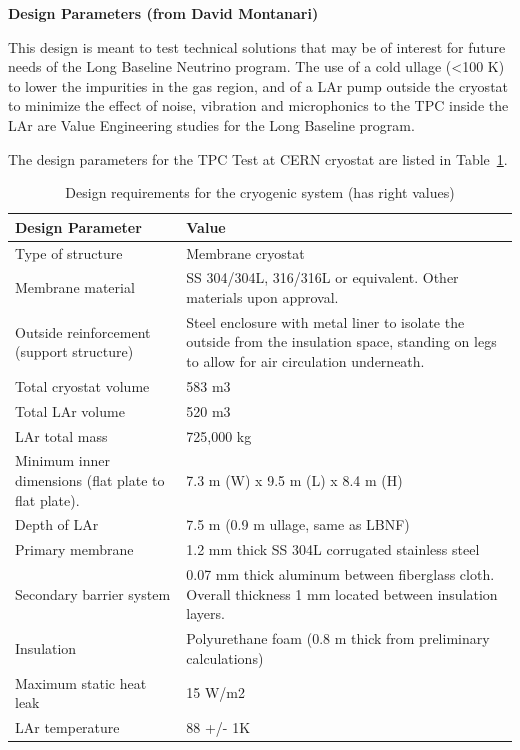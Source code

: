 \textbf{Design Parameters (from David Montanari)}

This design is meant to test technical solutions that may be of interest for future needs of the Long Baseline Neutrino program. The use of a cold ullage (\textless 100 K) to lower the impurities in the gas region, and of a LAr pump outside the cryostat to minimize the effect of noise, vibration and microphonics to the TPC inside the LAr are Value Engineering studies for the Long Baseline program.

The design parameters for the TPC Test at CERN cryostat are listed in Table~\ref{tbl:cryogenics-design-parameters}.

\begin{table}[htpb]
\caption{Design requirements for the cryogenic system (has right values)}
\label{tbl:cryogenics-design-parameters}
\centering
\begin{tabular}{|p{}|p{}|}
\hline
\textbf{Design Parameter} & \textbf{Value} \\ \hline
Type of structure & Membrane cryostat \\ \hline
Membrane material    &  SS 304/304L, 316/316L or equivalent. 
Other materials upon approval.\\ \hline
 Outside reinforcement (support structure)  &  Steel enclosure with metal liner to isolate the outside from the insulation space, standing on legs to allow for air circulation underneath. \\ \hline
 Total cryostat volume  &  583 m3 \\ \hline
 Total LAr volume  &  520 m3 \\ \hline
LAr total mass   & 725,000 kg  \\ \hline
Minimum inner dimensions (flat plate to flat plate).   &  7.3 m (W) x 9.5 m (L) x 8.4 m (H) \\ \hline
Depth of LAr   &  7.5 m (0.9 m ullage, same as LBNF) \\ \hline
Primary membrane   &   1.2 mm thick SS 304L corrugated stainless steel\\ \hline
Secondary barrier system   &  0.07 mm thick aluminum between fiberglass cloth. Overall thickness 1 mm located between insulation layers.  \\ \hline
 Insulation  &  Polyurethane foam (0.8 m thick from preliminary calculations) \\ \hline
Maximum static heat leak   &  15 W/m2 \\ \hline
LAr temperature   & 88 +/- 1K  \\ \hline

\end{tabular}
\end{table}
